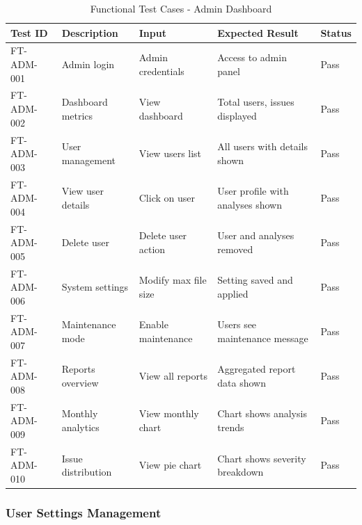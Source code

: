 \documentclass[12pt,a4paper]{article}
\begin{document}
    \begin{table}[H]
        \caption{Functional Test Cases - Admin Dashboard}
        \begin{tabular}{|p{2cm}|p{4cm}|p{3cm}|p{3cm}|p{1.5cm}|}
            \hline
            \textbf{Test ID} & \textbf{Description} & \textbf{Input} & \textbf{Expected Result} & \textbf{Status} \\
            \hline
            FT-ADM-001 & Admin login & Admin credentials & Access to admin panel & Pass \\
            \hline
            FT-ADM-002 & Dashboard metrics & View dashboard & Total users, issues displayed & Pass \\
            \hline
            FT-ADM-003 & User management & View users list & All users with details shown & Pass \\
            \hline
            FT-ADM-004 & View user details & Click on user & User profile with analyses shown & Pass \\
            \hline
            FT-ADM-005 & Delete user & Delete user action & User and analyses removed & Pass \\
            \hline
            FT-ADM-006 & System settings & Modify max file size & Setting saved and applied & Pass \\
            \hline
            FT-ADM-007 & Maintenance mode & Enable maintenance & Users see maintenance message & Pass \\
            \hline
            FT-ADM-008 & Reports overview & View all reports & Aggregated report data shown & Pass \\
            \hline
            FT-ADM-009 & Monthly analytics & View monthly chart & Chart shows analysis trends & Pass \\
            \hline
            FT-ADM-010 & Issue distribution & View pie chart & Chart shows severity breakdown & Pass \\
            \hline
        \end{tabular}
    \end{table}

    \subsubsection{User Settings Management}
\end{document}
